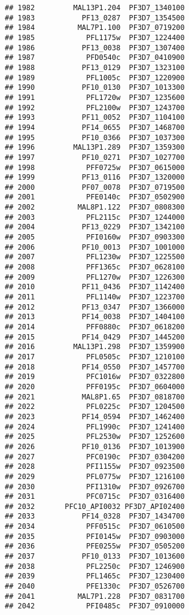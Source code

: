 \documentclass[12pt, a4paper]{article}\usepackage[]{graphicx}\usepackage[]{color}
\makeatletter
\newenvironment{kframe}{%
 \def\at@end@of@kframe{}%
 \ifinner\ifhmode%
  \def\at@end@of@kframe{\end{minipage}}%
  \begin{minipage}{\columnwidth}%
 \fi\fi%
 \def\FrameCommand##1{\hskip\@totalleftmargin \hskip-\fboxsep
 \colorbox{shadecolor}{##1}\hskip-\fboxsep
     \hskip-\linewidth \hskip-\@totalleftmargin \hskip\columnwidth}%
 \MakeFramed {\advance\hsize-\width
   \@totalleftmargin\z@ \linewidth\hsize
   \@setminipage}}%
 {\par\unskip\endMakeFramed%
 \at@end@of@kframe}
\newenvironment{knitrout}{}{} %
\makeatother
\begin{document}
\begin{knitrout}
\begin{kframe}
\begin{verbatim}
## 1982         MAL13P1.204  PF3D7_1340100
## 1983           PF13_0287  PF3D7_1354500
## 1984          MAL7P1.100  PF3D7_0719200
## 1985            PFL1175w  PF3D7_1224400
## 1986           PF13_0038  PF3D7_1307400
## 1987            PFD0540c  PF3D7_0410900
## 1988           PF13_0129  PF3D7_1323100
## 1989            PFL1005c  PF3D7_1220900
## 1990           PF10_0130  PF3D7_1013300
## 1991            PFL1720w  PF3D7_1235600
## 1992            PFL2100w  PF3D7_1243700
## 1993           PF11_0052  PF3D7_1104100
## 1994           PF14_0655  PF3D7_1468700
## 1995           PF10_0366  PF3D7_1037300
## 1996         MAL13P1.289  PF3D7_1359300
## 1997           PF10_0271  PF3D7_1027700
## 1998            PFF0725w  PF3D7_0615000
## 1999           PF13_0116  PF3D7_1320000
## 2000           PF07_0078  PF3D7_0719500
## 2001            PFE0140c  PF3D7_0502900
## 2002          MAL8P1.122  PF3D7_0808300
## 2003            PFL2115c  PF3D7_1244000
## 2004           PF13_0229  PF3D7_1342100
## 2005            PFI0160w  PF3D7_0903300
## 2006           PF10_0013  PF3D7_1001000
## 2007            PFL1230w  PF3D7_1225500
## 2008            PFF1365c  PF3D7_0628100
## 2009            PFL1270w  PF3D7_1226300
## 2010           PF11_0436  PF3D7_1142400
## 2011            PFL1140w  PF3D7_1223700
## 2012           PF13_0347  PF3D7_1366000
## 2013           PF14_0038  PF3D7_1404100
## 2014            PFF0880c  PF3D7_0618200
## 2015           PF14_0429  PF3D7_1445200
## 2016         MAL13P1.298  PF3D7_1359900
## 2017            PFL0505c  PF3D7_1210100
## 2018           PF14_0550  PF3D7_1457700
## 2019            PFC1016w  PF3D7_0322800
## 2020            PFF0195c  PF3D7_0604000
## 2021           MAL8P1.65  PF3D7_0818700
## 2022            PFL0225c  PF3D7_1204500
## 2023           PF14_0594  PF3D7_1462400
## 2024            PFL1990c  PF3D7_1241400
## 2025            PFL2530w  PF3D7_1252600
## 2026           PF10_0136  PF3D7_1013900
## 2027            PFC0190c  PF3D7_0304200
## 2028            PFI1155w  PF3D7_0923500
## 2029            PFL0775w  PF3D7_1216100
## 2030            PFI1310w  PF3D7_0926700
## 2031            PFC0715c  PF3D7_0316400
## 2032       PFC10_API0032 PF3D7_API02400
## 2033           PF14_0328  PF3D7_1434700
## 2034            PFF0515c  PF3D7_0610500
## 2035            PFI0145w  PF3D7_0903000
## 2036            PFE0255w  PF3D7_0505200
## 2037           PF10_0133  PF3D7_1013600
## 2038            PFL2250c  PF3D7_1246900
## 2039            PFL1465c  PF3D7_1230400
## 2040            PFE1330c  PF3D7_0526700
## 2041          MAL7P1.228  PF3D7_0831700
## 2042            PFI0485c  PF3D7_0910000

\end{verbatim}
\end{kframe}
\end{knitrout}
\end{document}
